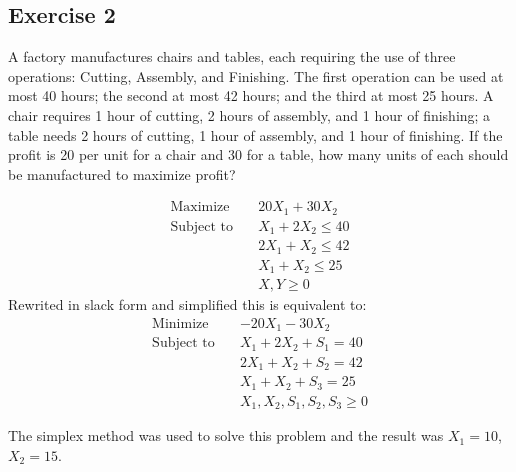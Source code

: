 \subsection{Exercise 2}
A factory manufactures chairs and tables, each requiring the use of three operations: Cutting, Assembly, and Finishing. The first operation can be used at most 40 hours; the second at most 42 hours; and the third at most 25 hours. A chair requires 1 hour of cutting, 2 hours of assembly, and 1 hour of finishing; a table needs 2 hours of cutting, 1 hour of assembly, and 1 hour of finishing. If the profit is 20 per unit for a chair and 30 for a table, how many units of each should be manufactured to maximize profit?

\begin{equation}
    \begin{aligned}
        \text{Maximize} \quad   & 20X_1 + 30X_2      \\
        \text{Subject to} \quad & X_1 + 2X_2 \leq 40 \\
                                & 2X_1 + X_2 \leq 42 \\
                                & X_1 + X_2 \leq 25  \\
                                & X, Y \geq 0
    \end{aligned}
\end{equation}
Rewrited in slack form and simplified this is equivalent to:
\begin{equation}
    \begin{aligned}
        \text{Minimize} \quad   & -20X_1 - 30X_2                 \\
        \text{Subject to} \quad & X_1 + 2X_2 + S_1 = 40          \\
                                & 2X_1 + X_2 + S_2 = 42          \\
                                & X_1 + X_2 + S_3 = 25           \\
                                & X_1, X_2, S_1, S_2, S_3 \geq 0
    \end{aligned}
\end{equation}

The simplex method was used to solve this problem and the result was $X_1 = 10$, $X_2 = 15$.

